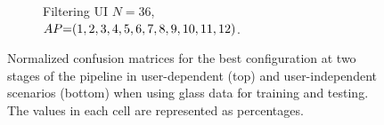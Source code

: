 \begin{figure}[ht]
\begin{subfigure}{.49\textwidth}
    \vspace{-15pt}
    \captionsetup{width=.99\linewidth}
    \caption{Filtering UI $N{=}36$, \\ $\splitatcommas{AP{=}(1, 2, 3, 4, 5, 6, 7, 8, 9, 10, 11, 12)}$.}
    \label{fig:radar-experiments:through-materials:glass-confusion:filtering-ui}
  \end{subfigure}

  \vspace{-6pt}
    \caption{Normalized confusion matrices for the best configuration at two stages of the pipeline in user-dependent (top) and user-independent scenarios (bottom) when using glass data for training and testing. The values in each cell are represented as percentages.}
    \label{fig:radar-experiments:through-materials:glass-confusion}
\end{figure}





